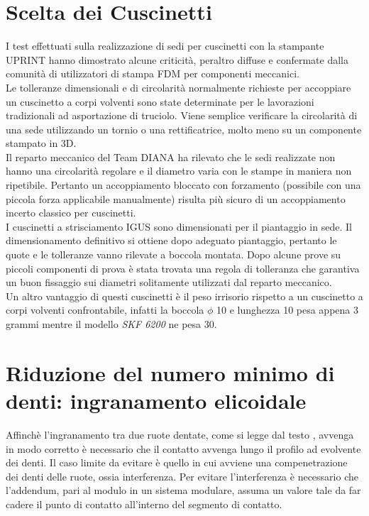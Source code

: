 \documentclass[%
corpo=11pt,
twoside,
 stile=classica,
oldstyle,
greek,%
]{toptesi}
\begin{document}
	\section{Scelta dei Cuscinetti}
	I test effettuati sulla realizzazione di sedi per cuscinetti con la stampante UPRINT hanno dimostrato alcune criticità, peraltro diffuse e confermate dalla comunità di utilizzatori di stampa FDM per componenti meccanici. \\
	Le tolleranze dimensionali e di circolarità normalmente richieste per accoppiare un cuscinetto a corpi volventi sono state determinate per le lavorazioni tradizionali ad asportazione di truciolo. Viene semplice verificare la circolarità di una sede utilizzando un tornio o una rettificatrice, molto meno su un componente stampato in 3D. \\
	Il reparto meccanico del Team DIANA ha rilevato che le sedi realizzate non hanno una circolarità regolare e il diametro varia con le stampe in maniera non ripetibile. Pertanto un accoppiamento bloccato con forzamento (possibile con una piccola forza applicabile manualmente) risulta più sicuro di un accoppiamento incerto classico per cuscinetti. \\
	I cuscinetti a strisciamento IGUS sono dimensionati per il piantaggio in sede. Il dimensionamento definitivo si ottiene dopo adeguato piantaggio, pertanto le quote e le tolleranze vanno rilevate a boccola montata.
	Dopo alcune prove su piccoli componenti di prova è stata trovata una regola di tolleranza che garantiva un buon fissaggio sui diametri solitamente utilizzati dal reparto meccanico. \\
	Un altro vantaggio di questi cuscinetti è il peso irrisorio rispetto a un cuscinetto a corpi volventi confrontabile, infatti la boccola $\phi$ 10 e lunghezza 10 pesa appena 3 grammi mentre il modello \textit{SKF 6200} ne pesa 30. 
	
	
	
	\section{Riduzione del numero minimo di denti: ingranamento elicoidale}
	Affinchè l'ingranamento tra due ruote dentate, come si legge dal testo \cite{Jacazioteo}, avvenga in modo corretto è necessario che il contatto avvenga lungo il profilo ad evolvente dei denti. Il caso limite da evitare è quello in cui avviene una compenetrazione dei denti delle ruote, ossia interferenza. Per evitare l'interferenza è necessario che l'addendum, pari al modulo in un sistema modulare, assuma un valore tale da far cadere il punto di contatto all'interno del segmento di contatto. 
	
\end{document}
